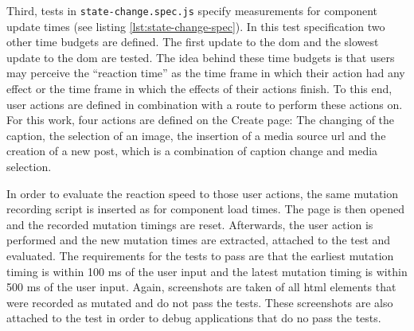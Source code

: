 \documentclass[a4paper, 12pt]{article}
\begin{document}
Third, tests in \verb|state-change.spec.js| specify measurements for component update times (see listing \ref{lst:state-change-spec}).
In this test specification two other time budgets are defined.
The first update to the \acrshort{dom} and the slowest update to the \acrshort{dom} are tested.
The idea behind these time budgets is that users may perceive the \enquote{reaction time} as the time frame in which their action had any effect or the time frame in which the effects of their actions finish.
To this end, user actions are defined in combination with a route to perform these actions on.
For this work, four actions are defined on the Create page: The changing of the caption, the selection of an image, the insertion of a media source \acrshort{url} and the creation of a new post, which is a combination of caption change and media selection.

In order to evaluate the reaction speed to those user actions, the same mutation recording script is inserted as for component load times.
The page is then opened and the recorded mutation timings are reset. Afterwards, the user action is performed and the new mutation times are extracted, attached to the test and evaluated.
The requirements for the tests to pass are that the earliest mutation timing is within 100 ms of the user input and the latest mutation timing is within 500 ms of the user input.
Again, screenshots are taken of all \acrshort{html} elements that were recorded as mutated and do not pass the tests.
These screenshots are also attached to the test in order to debug applications that do no pass the tests.
\end{document}
